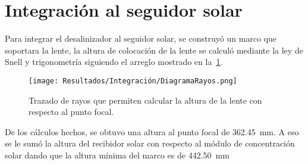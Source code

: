 	
	\section{Integración al seguidor solar}
	
		Para integrar el desalinizador al seguidor solar, se construyó un marco que soportara la lente, la altura de colocación de la lente se calculó mediante la ley de Snell y trigonometría siguiendo el arreglo mostrado en la~\cref{fig:DiagramaRayos}.
		
		\begin{figure}[H]
			\centering
			\texttt{[image: Resultados/Integración/DiagramaRayos.png]}
			\caption{Trazado de rayos que permiten calcular la altura de la lente con respecto al punto focal.}
			\label{fig:DiagramaRayos}
		\end{figure}
		
		
		De los cálculos hechos, se obtuvo una altura al punto focal de \qty{362.45}{\mm}. A eso se le sumó la altura del recibidor solar con respecto al módulo de concentración solar dando que la altura mínima del marco es de \qty{442.50}{\mm}
		
			
			


			
			
			
			